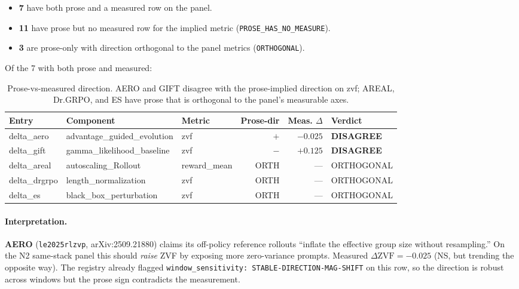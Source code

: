 \documentclass{article}
\begin{document}
\begin{itemize}
\item \textbf{7} have both prose and a measured row on the panel.
\item \textbf{11} have prose but no measured row for the implied metric
(\texttt{PROSE\_HAS\_NO\_MEASURE}).
\item \textbf{3} are prose-only with direction orthogonal to the panel
metrics (\texttt{ORTHOGONAL}).
\end{itemize}

Of the 7 with both prose and measured:

\begin{table}[h]
\centering
\small
\begin{tabular}{lllrrl}
\toprule
Entry & Component & Metric & Prose-dir & Meas. $\Delta$ & Verdict \\
\midrule
delta\_aero  & advantage\_guided\_evolution & zvf         & $+$   & $-0.025$ & \textbf{DISAGREE} \\
delta\_gift  & gamma\_likelihood\_baseline   & zvf         & $-$   & $+0.125$ & \textbf{DISAGREE} \\
delta\_areal & autoscaling\_Rollout         & reward\_mean & ORTH  & ---      & ORTHOGONAL \\
delta\_drgrpo & length\_normalization       & zvf         & ORTH  & ---      & ORTHOGONAL \\
delta\_es    & black\_box\_perturbation      & zvf         & ORTH  & ---      & ORTHOGONAL \\
\bottomrule
\end{tabular}
\caption{Prose-vs-measured direction. AERO and GIFT disagree with the
prose-implied direction on zvf; AREAL, Dr.GRPO, and ES have prose that
is orthogonal to the panel's measurable axes.}
\label{tab:p6-iter150-prose}
\end{table}

\paragraph{Interpretation.}
\textbf{AERO} (\texttt{le2025rlzvp}, arXiv:2509.21880) claims its
off-policy reference rollouts ``inflate the effective group size
without resampling.'' On the N2 same-stack panel this should \emph{raise}
ZVF by exposing more zero-variance prompts. Measured $\Delta \text{ZVF}
= -0.025$ (NS, but trending the opposite way). The registry already
flagged \texttt{window\_sensitivity: STABLE-DIRECTION-MAG-SHIFT} on this
row, so the direction is robust across windows but the prose sign
contradicts the measurement.
\end{document}
